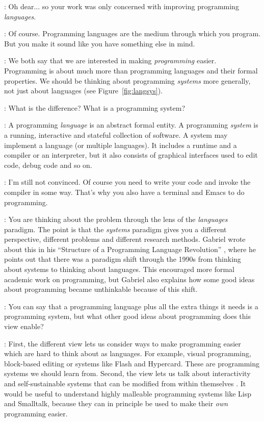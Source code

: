 \documentclass[runningheads]{llncs}
\newcommand{\T}{Tomas}
\newcommand{\J}{Joel}
\newcommand{\says}[2][gg]{\vspace{0.5em}\noindent\hangindent=0.5cm{\textsc{#1}}: #2}
\begin{document}
\says[\J]{Oh dear... so your work was only concerned with improving programming \emph{languages}.}

\says[\T]{Of course. Programming languages are the medium through which you program. But you make it sound like you have something else in mind.}

\says[\J]{We both say that we are interested in making \emph{programming} easier. Programming is about much more than programming languages and their formal properties. We should be thinking about programming \emph{systems} more generally, not just about languages (see Figure~\ref{fig:langsys}).}

\says[\T]{What is the difference? What is a programming system?}

\says[\J]{A programming \emph{language} is an abstract formal entity. A programming \emph{system} is a running, interactive and stateful collection of software. A system may implement a language (or multiple languages). It includes a runtime and a compiler or an interpreter, but it also consists of graphical interfaces used to edit code, debug code and so on.}

\says[\T]{I'm still not convinced. Of course you need to write your code and invoke the compiler in some way. That's why you also have a terminal and Emacs to do programming.}

\says[\J]{You are thinking about the problem through the lens of the \emph{languages} paradigm. The point is that the \emph{systems} paradigm gives you a different perspective, different problems and different research methods. Gabriel wrote about this in his ``Structure of a Programming Language Revolution'' \cite{rpg-2012-revolution}, where he points out that there was a paradigm shift through the 1990s from thinking about systems to thinking about languages. This encouraged more formal academic work on programming, but Gabriel also explains how some good ideas about programming became unthinkable because of this shift.}

\says[\T]{You can say that a programming language plus all the extra things it needs is a programming system, but what other good ideas about programming does this view enable?}

\says[\J]{First, the different view lets us consider ways to make programming easier which are hard to think about as languages. For example, visual programming, block-based editing \cite{resnick-2009-scratch} or systems like Flash \cite{ankerson-2018-dot} and Hypercard. These are programming systems we should learn from. Second, the view lets us talk about interactivity and self-sustainable systems that can be modified from within themselves \cite{hirschfeld-2008-s3,hirschfeld-2010-s3}. It would be useful to understand highly malleable programming systems like Lisp and Smalltalk, because they can in principle be used to make their \emph{own} programming easier.}
\end{document}
